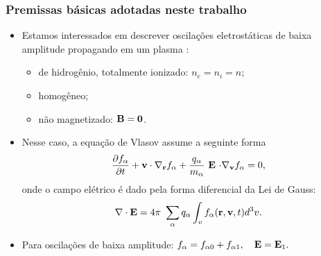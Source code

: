 \documentclass[10pt,aspectratio=1610,lualatex]{beamer}
\begin{document}
\begin{frame}\frametitle{Premissas básicas adotadas neste trabalho} \label{common}
  \begin{itemize}
  \item Estamos interessados em descrever \alert{oscilações eletrostáticas} de
    \alert{baixa amplitude} propagando em um plasma :
    \begin{itemize}
      \item de hidrogênio, totalmente ionizado: $n_e=n_i=n$;
      \item homogêneo;
      \item não magnetizado: ${\bf B=0}$.
    \end{itemize}
    \pause
  \item Nesse caso, a equação de Vlasov assume a seguinte forma
    \begin{equation*}
      \frac{\partial f_\alpha}{\partial t}+{\bf v \cdot \nabla_r}f_\alpha
      +\frac{q_\alpha}{m_\alpha}\ {\bf E}\ {\bf\cdot \nabla_v}f_\alpha=0,
    \end{equation*}
    onde o campo elétrico é dado pela forma diferencial da Lei
    de Gauss:
    \begin{equation*}
      {\bf \nabla \cdot E}  = 4\pi\ \sum_\alpha q_\alpha
      \int_v  f_\alpha({\bf r},{\bf v},t) d^3v.
    \end{equation*}
    \pause
    \item Para oscilações de baixa amplitude: $f_{\alpha}=f_{\alpha0}+f_{\alpha1},\quad
      {\bf E}={\bf E}_1.$
  \end{itemize}
\end{frame}
\end{document}

